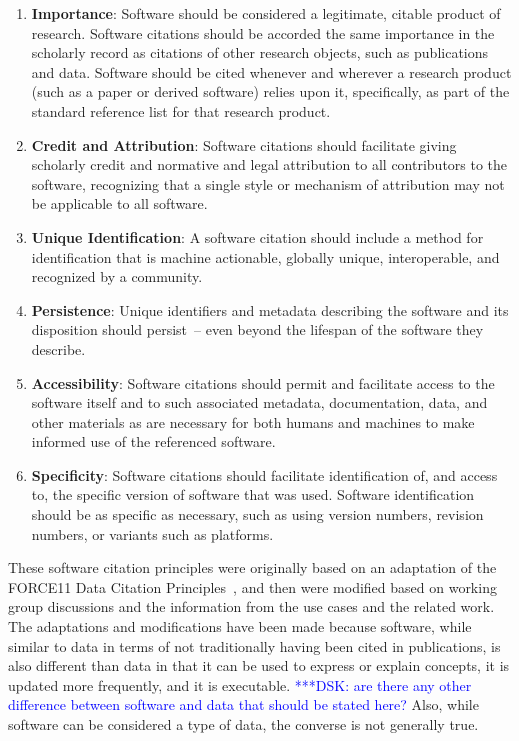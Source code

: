 \documentclass[11pt, oneside]{amsart}
\newcommand{\katznote}[1]{ {\textcolor{blue} { ***DSK: #1 }}} %
\begin{document}
\begin{enumerate}
\item \textbf{Importance}: \label{principle:importance}
Software should be considered a legitimate, citable product of research. Software citations should be accorded the same importance in the scholarly record as citations of other research objects, such as publications and data. Software should be cited whenever and wherever a research product (such as a paper or derived software) relies upon it, specifically, as part of the standard reference list for that research product.
\item \textbf{Credit and Attribution}: \label{principle:credit}
Software citations should facilitate giving scholarly credit and normative
and legal attribution to all contributors to the software, recognizing
that a single style or mechanism of attribution may not be applicable to
all software.
\item \textbf{Unique Identification}: \label{principle:uid}
A software citation should include a method for identification that is
machine actionable, globally unique, interoperable, and recognized by
a community.
\item \textbf{Persistence}: \label{principle:persistence}
Unique identifiers and metadata describing the software and its disposition should persist~-- even beyond the lifespan of the software they describe.
\item \textbf{Accessibility}: \label{principle:accessibility}
Software citations should permit and facilitate access to the software itself and to such associated metadata, documentation, data, and other materials as are necessary for both humans and machines to make informed use of the referenced software.
\item \textbf{Specificity}:
Software citations should facilitate identification of, and access to, the specific version of software that was used.  Software identification should be as specific as necessary, such as using version numbers, revision numbers, or variants such as platforms.
\end{enumerate}

These software citation principles were originally based on an adaptation of the FORCE11 Data Citation Principles~\cite{data-citation-principles}, and then were modified based on working group discussions and the information from the use cases and the related work.
The adaptations and modifications have been made because software, while similar to data in terms of not traditionally having been cited in publications, is also different than data in that it can be used to express or explain concepts, it is updated more frequently, and it is executable.  \katznote{are there any other difference between software and data that should be stated here?}  Also, while software can be considered a type of data, the converse is not generally true.
\end{document}
